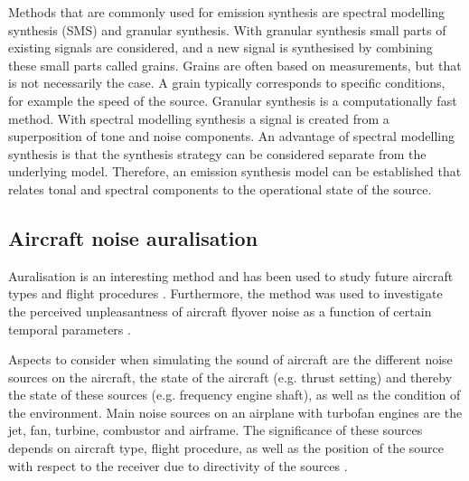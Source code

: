 Methods that are commonly used for emission synthesis are spectral modelling
synthesis (SMS) and granular synthesis. With granular synthesis small parts of
existing signals are considered, and a new signal is synthesised by combining
these small parts called grains. Grains are often based on measurements, but
that is not necessarily the case. A grain typically corresponds to specific
conditions, for example the speed of the source. Granular
synthesis is a computationally fast method. With spectral modelling synthesis a
signal is created from a superposition of tone and noise components. An
advantage of spectral modelling synthesis is that the synthesis strategy can be
considered separate from the underlying model. Therefore, an emission synthesis
model can be established that relates tonal and spectral components to the
operational state of the source.

\subsection{Aircraft noise auralisation}
Auralisation is an interesting method and has been used to study future aircraft
types \cite{Rizzi2013,Rizzi2016,Rizzi2016a} and flight procedures
\cite{Sahai2016}. Furthermore, the method was used to investigate the perceived
unpleasantness of aircraft flyover noise as a function of certain temporal
parameters \cite{Pate2017}.

Aspects to consider when simulating the sound of aircraft are the different
noise sources on the aircraft, the state of the aircraft (e.g. thrust setting) and thereby the state
of these sources (e.g. frequency engine shaft), as well as the condition of the environment. Main noise
sources on an airplane with turbofan engines are the jet, fan, turbine,
combustor and airframe. The significance of these sources depends on aircraft
type, flight procedure, as well as the position of the source with respect to
the receiver due to directivity of the sources \cite{Bertsch2015}.


